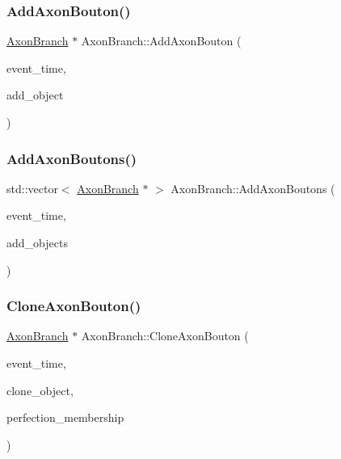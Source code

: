 \subsubsection{\texorpdfstring{Add\+Axon\+Bouton()}{AddAxonBouton()}}
{\footnotesize\ttfamily \mbox{\hyperlink{classAxonBranch}{Axon\+Branch}} $\ast$ Axon\+Branch\+::\+Add\+Axon\+Bouton (\begin{DoxyParamCaption}\item[{std\+::chrono\+::time\+\_\+point$<$ \mbox{\hyperlink{universe_8h_a0ef8d951d1ca5ab3cfaf7ab4c7a6fd80}{Clock}} $>$}]{event\+\_\+time,  }\item[{\mbox{\hyperlink{classAxonBranch}{Axon\+Branch}} $\ast$}]{add\+\_\+object }\end{DoxyParamCaption})}

\mbox{\label{classAxonBranch_a788ca8cc7e6f60f07b9e19a8e3022b64}} 
\subsubsection{\texorpdfstring{Add\+Axon\+Boutons()}{AddAxonBoutons()}}
{\footnotesize\ttfamily std\+::vector$<$ \mbox{\hyperlink{classAxonBranch}{Axon\+Branch}} $\ast$ $>$ Axon\+Branch\+::\+Add\+Axon\+Boutons (\begin{DoxyParamCaption}\item[{std\+::chrono\+::time\+\_\+point$<$ \mbox{\hyperlink{universe_8h_a0ef8d951d1ca5ab3cfaf7ab4c7a6fd80}{Clock}} $>$}]{event\+\_\+time,  }\item[{std\+::vector$<$ \mbox{\hyperlink{classAxonBranch}{Axon\+Branch}} $\ast$$>$}]{add\+\_\+objects }\end{DoxyParamCaption})}

\mbox{\label{classAxonBranch_ae861207a8a0aeb2b60c305b25248e4b9}} 
\subsubsection{\texorpdfstring{Clone\+Axon\+Bouton()}{CloneAxonBouton()}}
{\footnotesize\ttfamily \mbox{\hyperlink{classAxonBranch}{Axon\+Branch}} $\ast$ Axon\+Branch\+::\+Clone\+Axon\+Bouton (\begin{DoxyParamCaption}\item[{std\+::chrono\+::time\+\_\+point$<$ \mbox{\hyperlink{universe_8h_a0ef8d951d1ca5ab3cfaf7ab4c7a6fd80}{Clock}} $>$}]{event\+\_\+time,  }\item[{\mbox{\hyperlink{classAxonBranch}{Axon\+Branch}} $\ast$}]{clone\+\_\+object,  }\item[{double}]{perfection\+\_\+membership }\end{DoxyParamCaption})}

